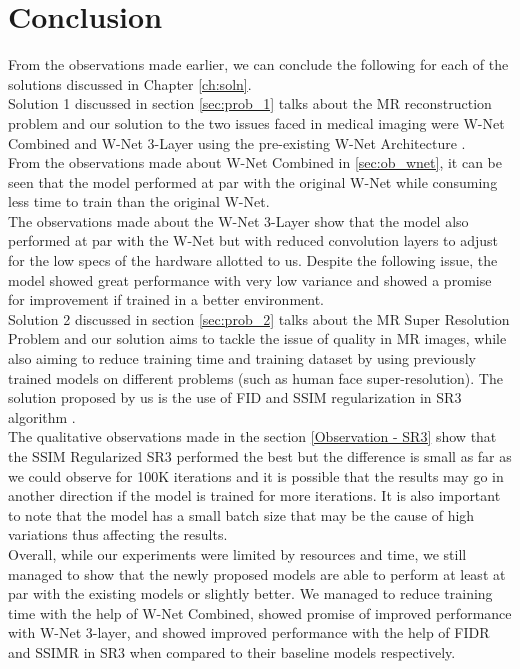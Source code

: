 \def\baselinestretch{1}
\chapter{Conclusion}
\ifpdf
    \graphicspath{{Conclusions/ConclusionsFigs/PNG/}{Conclusions/ConclusionsFigs/PDF/}{Conclusions/ConclusionsFigs/}}
\else
    \graphicspath{{Conclusions/ConclusionsFigs/EPS/}{Conclusions/ConclusionsFigs/}}
\fi

From the observations made earlier, we can conclude the following for each of the solutions discussed in Chapter \ref{ch:soln}.\\

Solution 1 discussed in section \ref{sec:prob_1} talks about the MR reconstruction problem and our solution to the two issues faced in medical imaging were W-Net Combined and W-Net 3-Layer using the pre-existing W-Net Architecture \cite{8919674}.\\

From the observations made about W-Net Combined in \ref{sec:ob_wnet}, it can be seen that the model performed at par with the original W-Net while consuming less time to train than the original W-Net.\\

The observations made about the W-Net 3-Layer show that the model also performed at par with the W-Net but with reduced convolution layers to adjust for the low specs of the hardware allotted to us. Despite the following issue, the model showed great performance with very low variance and showed a promise for improvement if trained in a better environment.\\

Solution 2 discussed in section \ref{sec:prob_2} talks about the MR Super Resolution Problem and our solution aims to tackle the issue of quality in MR images, while also aiming to reduce training time and training dataset by using previously trained models on different problems (such as human face super-resolution). The solution proposed by us is the use of FID and SSIM regularization in SR3 algorithm \cite{saharia2021image}.\\

The qualitative observations made in the section \ref{Observation - SR3} show that the SSIM Regularized SR3 performed the best but the difference is small as far as we could observe for 100K iterations and it is possible that the results may go in another direction if the model is trained for more iterations. It is also important to note that the model has a small batch size that may be the cause of high variations thus affecting the results.\\

Overall, while our experiments were limited by resources and time, we still managed to show that the newly proposed models are able to perform at least at par with the existing models or slightly better. We managed to reduce training time with the help of W-Net Combined, showed promise of improved performance with W-Net 3-layer, and showed improved performance with the help of FIDR and SSIMR in SR3 when compared to their baseline models respectively.\\

